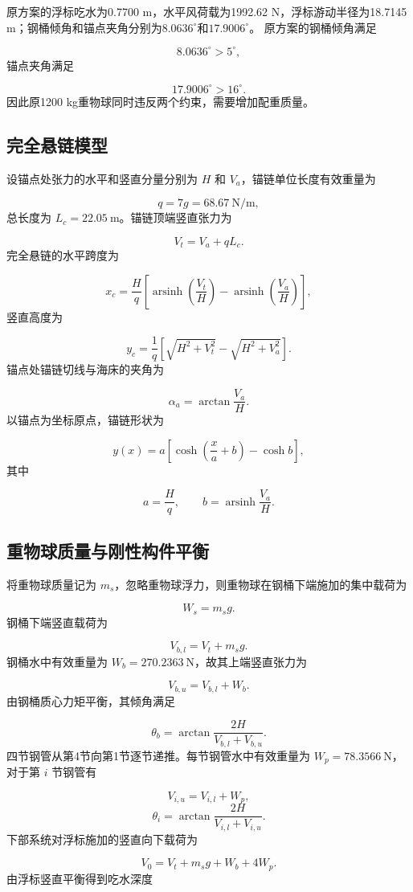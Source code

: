 \documentclass[UTF8,zihao=-4,a4paper,fontset=fandol]{ctexart}
\begin{document}
原方案的浮标吃水为0.7700 m，水平风荷载为1992.62 N，浮标游动半径为18.7145 m；钢桶倾角和锚点夹角分别为$8.0636^\circ$和$17.9006^\circ$。
原方案的钢桶倾角满足

\[
8.0636^\circ>5^\circ,
\]
锚点夹角满足

\[
17.9006^\circ>16^\circ.
\]
因此原1200 kg重物球同时违反两个约束，需要增加配重质量。

\subsection{完全悬链模型}
设锚点处张力的水平和竖直分量分别为 \(H\) 和 \(V_a\)，锚链单位长度有效重量为

\[
q=7g=68.67\ \mathrm{N/m},
\]
总长度为 \(L_c=22.05\ \mathrm m\)。锚链顶端竖直张力为

\[
V_t=V_a+qL_c. \tag{2}
\]
完全悬链的水平跨度为

\[
x_c=\frac{H}{q}
\left[
\operatorname{arsinh}\left(\frac{V_t}{H}\right)
-\operatorname{arsinh}\left(\frac{V_a}{H}\right)
\right], \tag{3}
\]
竖直高度为

\[
y_c=\frac{1}{q}
\left[
\sqrt{H^2+V_t^2}-\sqrt{H^2+V_a^2}
\right]. \tag{4}
\]
锚点处锚链切线与海床的夹角为

\[
\alpha_a=\arctan\frac{V_a}{H}. \tag{5}
\]
以锚点为坐标原点，锚链形状为

\[
y(x)=a\left[
\cosh\left(\frac{x}{a}+b\right)-\cosh b
\right], \tag{6}
\]
其中

\[
a=\frac{H}{q},
\qquad
b=\operatorname{arsinh}\frac{V_a}{H}.
\]
\subsection{重物球质量与刚性构件平衡}
将重物球质量记为 \(m_s\)，忽略重物球浮力，则重物球在钢桶下端施加的集中载荷为

\[
W_s=m_sg. \tag{7}
\]
钢桶下端竖直载荷为

\[
V_{b,l}=V_t+m_sg. \tag{8}
\]
钢桶水中有效重量为 \(W_b=270.2363\ \mathrm N\)，故其上端竖直张力为

\[
V_{b,u}=V_{b,l}+W_b. \tag{9}
\]
由钢桶质心力矩平衡，其倾角满足

\[
\theta_b=\arctan
\frac{2H}{V_{b,l}+V_{b,u}}. \tag{10}
\]
四节钢管从第4节向第1节逐节递推。每节钢管水中有效重量为 \(W_p=78.3566\ \mathrm N\)，对于第 \(i\) 节钢管有

\[
V_{i,u}=V_{i,l}+W_p, \tag{11}
\]
\[
\theta_i=\arctan
\frac{2H}{V_{i,l}+V_{i,u}}. \tag{12}
\]
下部系统对浮标施加的竖直向下载荷为

\[
V_0=V_t+m_sg+W_b+4W_p. \tag{13}
\]
由浮标竖直平衡得到吃水深度
\end{document}
